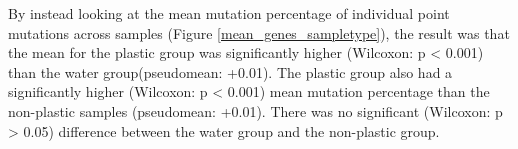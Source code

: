 By instead looking at the mean mutation percentage of individual point mutations across samples (Figure \ref{mean_genes_sampletype}), the result was that the mean for the plastic group was significantly higher (Wilcoxon: p < 0.001) than the water group(pseudomean: +0.01). The plastic group also had a significantly higher (Wilcoxon: p < 0.001) mean mutation percentage than the non-plastic samples (pseudomean: +0.01).
There was no significant (Wilcoxon: p > 0.05) difference between the water group and the non-plastic group.



